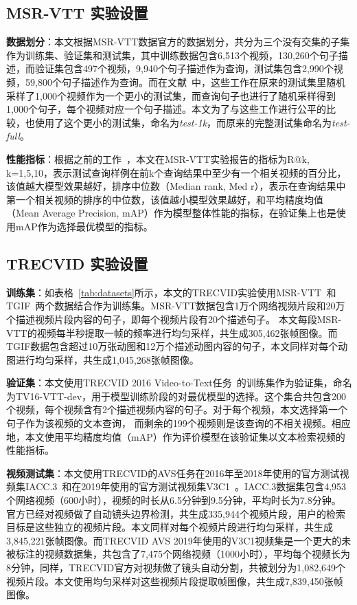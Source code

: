 

\subsection{MSR-VTT 实验设置} \label{ssec:setup-msrvtt}
\textbf{数据划分}：本文根据MSR-VTT数据官方的数据划分，共分为三个没有交集的子集作为训练集、验证集和测试集，其中训练数据包含6,513个视频，130,260个句子描述，而验证集包含497个视频，9,940个句子描述作为查询，测试集包含2,990个视频，59,800个句子描述作为查询。而在文献~\cite{liu2019use,miech2019howto100m,yu2018a}中，这些工作在原来的测试集里随机采样了1,000个视频作为一个更小的测试集，而查询句子也进行了随机采样得到1,000个句子，每个视频对应一个句子描述。本文为了与这些工作进行公平的比较，也使用了这个更小的测试集，命名为\textit{test-1k}，而原来的完整测试集命名为\textit{test-full}。

\textbf{性能指标}：根据之前的工作~\cite{dong2019dual,mithun2018learning}，本文在MSR-VTT实验报告的指标为R@k, k=1,5,10，表示测试查询样例在前k个查询结果中至少有一个相关视频的百分比，该值越大模型效果越好，排序中位数（Median rank, Med r），表示在查询结果中第一个相关视频的排序的中位数，该值越小模型效果越好，和平均精度均值（Mean Average Precision, mAP）作为模型整体性能的指标，在验证集上也是使用mAP作为选择最优模型的指标。

\subsection{TRECVID 实验设置} \label{ssec:setup-tv}

\textbf{训练集}：如表格~\ref{tab:datasets}所示，本文的TRECVID实验使用MSR-VTT~\cite{msrvtt}和TGIF~\cite{li2016tgif}两个数据结合作为训练集。MSR-VTT数据包含1万个网络视频片段和20万个描述视频片段内容的句子，即每个视频片段有20个描述句子。
本文每段MSR-VTT的视频每半秒提取一帧的频率进行均匀采样，共生成305,462张帧图像。而TGIF数据包含超过10万张动图和12万个描述动图内容的句子，本文同样对每个动图进行均匀采样，共生成1,045,268张帧图像。

\textbf{验证集}：本文使用TRECVID 2016 Video-to-Text任务~\cite{awad2016trecvid}的训练集作为验证集，命名为TV16-VTT-dev，用于模型训练阶段的对最优模型的选择。这个集合共包含200个视频，每个视频含有2个描述视频内容的句子。对于每个视频，本文选择第一个句子作为该视频的文本查询，
而剩余的199个视频则是该查询的不相关视频。相应地，本文使用平均精度均值（mAP）作为评价模型在该验证集以文本检索视频的性能指标。

\textbf{视频测试集}：本文使用TRECVID的AVS任务在2016年至2018年使用的官方测试视频集IACC.3~\cite{awad2016trecvid}和在2019年使用的官方测试视频集V3C1~\cite{berns2019v3c1}。IACC.3数据集包含4,953个网络视频（600小时），视频的时长从6.5分钟到9.5分钟，平均时长为7.8分钟。
官方已经对视频做了自动镜头边界检测，共生成335,944个视频片段，用户的检索目标是这些独立的视频片段。本文同样对每个视频片段进行均匀采样，共生成3,845,221张帧图像。而TRECVID AVS 2019年使用的V3C1视频集是一个更大的未被标注的视频数据集，共包含了7,475个网络视频（1000小时），平均每个视频长为8分钟，同样，TRECVID官方对视频做了镜头自动分割，共被划分为1,082,649个视频片段。本文使用均匀采样对这些视频片段提取帧图像，共生成7,839,450张帧图像。

